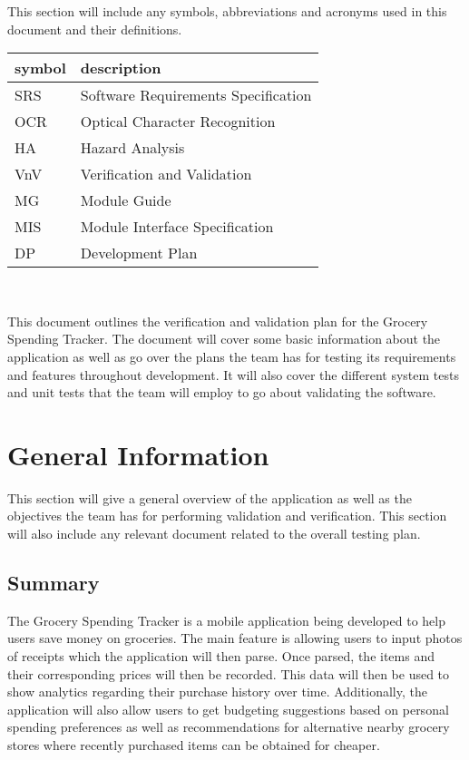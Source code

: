 \documentclass[12pt, titlepage]{article}
\begin{document}
This section will include any symbols, abbreviations and acronyms
used in this document and their definitions. \\

\renewcommand{\arraystretch}{1.2}
\begin{tabular}{l l} 
  \toprule		
  \textbf{symbol} & \textbf{description}\\
  \midrule 
  SRS & Software Requirements Specification\\
  OCR & Optical Character Recognition\\
  HA & Hazard Analysis\\
  VnV & Verification and Validation\\
  MG & Module Guide\\
  MIS & Module Interface Specification\\
  DP & Development Plan\\
  \bottomrule
\end{tabular}\\

\newpage


This document outlines the verification and validation plan for the Grocery Spending Tracker.
The document will cover some basic information about the application as well as go over the plans
the team has for testing its requirements and features throughout development. It will also cover
the different system tests and unit tests that the team will employ to go about validating
the software.

\section{General Information}

This section will give a general overview of the application as well as the objectives
the team has for performing validation and verification. This section will also include any
relevant document related to the overall testing plan.

\subsection{Summary}

The Grocery Spending Tracker is a mobile application being developed to help
users save money on groceries. The main feature is allowing users to input photos of receipts
which the application will then parse. Once parsed, the items and their corresponding prices will then be recorded.
This data will then be used to show analytics regarding their purchase history over time.
Additionally, the application will also allow users to get budgeting suggestions based on personal spending preferences
as well as recommendations for alternative nearby grocery stores where recently purchased items
can be obtained for cheaper.
\end{document}
